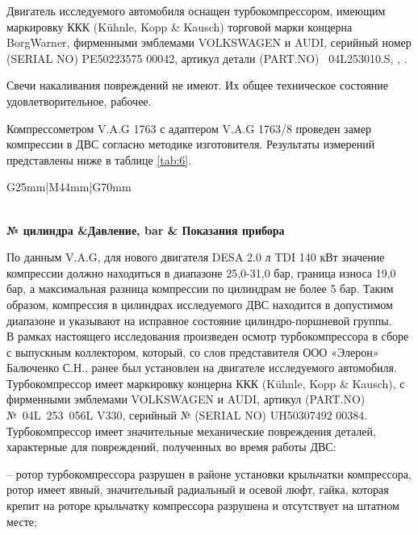 {Двигатель исследуемого автомобиля оснащен турбокомпрессором, имеющим маркировку ККК (Kühnle, Kopp \& Kausch) торговой марки  концерна BorgWarner,  фирменными эмблемами VOLKSWAGEN и AUDI, серийный номер (SERIAL NO) PE50223575 00042, артикул детали (PART.NO)  04L253010.S, , .






Свечи накаливания  повреждений не имеют. Их общее техническое состояние удовлетворительное, рабочее.  

Компрессометром V.A.G  1763  с адаптером V.A.G 1763/8 проведен замер компрессии в ДВС согласно методике изготовителя.  Результаты измерений представлены ниже в таблице \ref{tab:6}.
 
 
 \begin{longtable}{G{25mm}|M{44mm}|G{70mm}}
 	\caption[]{\footnotesize {Таблица компрессии}} 
 	\label{tab:6}\\ 
 	\hline 
 	\hline  \toprule 
 	\bf  {\footnotesize  № цилиндра}  &\bf {\small Давление, bar} & \bf {\small Показания прибора} \\   \hline\hline  \toprule \endhead 
 	
 	
По данным V.A.G, для нового двигателя  DESA 2.0 л TDI 140 кВт  значение компрессии должно находиться в диапазоне 25,0-31,0 бар,  граница износа 19,0 бар, а максимальная разница компрессии по цилиндрам не более 5 бар.  Таким образом, компрессия в цилиндрах исследуемого ДВС находится в допустимом диапазоне и указывают на исправное состояние цилиндро-поршневой группы.\\

В рамках настоящего исследования произведен осмотр турбокомпрессора в сборе с выпускным коллектором, который, со слов представителя ООО «Элерон» Балюченко С.Н., ранее был установлен на двигателе исследуемого автомобиля. Турбокомпрессор имеет маркировку  концерна ККК (Kühnle, Kopp \& Kausch), с фирменными эмблемами VOLKSWAGEN и AUDI, артикул (PART.NO) № 04L 253 056L V330, серийный № (SERIAL NO) UH50307492 00384.  Турбокомпрессор имеет значительные механические повреждения деталей, характерные для повреждений, полученных во время работы ДВС:

-- ротор турбокомпрессора разрушен в районе установки крыльчатки компрессора, ротор имеет явный, значительный радиальный и осевой люфт, гайка, которая крепит на роторе крыльчатку компрессора разрушена и отсутствует на штатном месте;


\end{longtable}}
